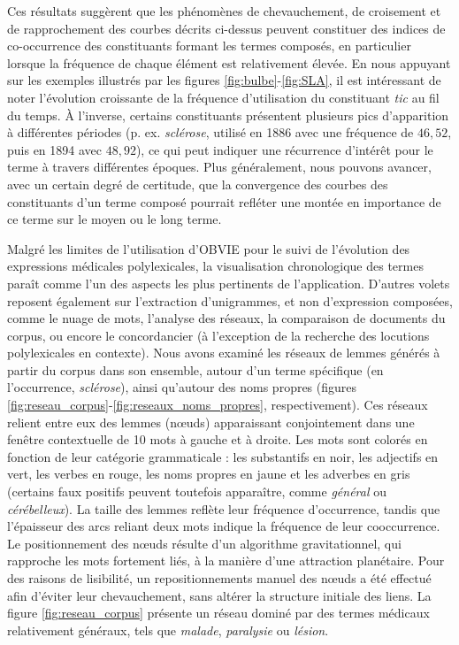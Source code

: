 Ces résultats suggèrent que les phénomènes de chevauchement, de croisement et de rapprochement des courbes décrits ci-dessus peuvent constituer des indices de co-occurrence des constituants formant les termes composés, en particulier lorsque la fréquence de chaque élément est relativement élevée. En nous appuyant sur les exemples illustrés par les figures \ref{fig:bulbe}-\ref{fig:SLA}, il est intéressant de noter l'évolution croissante de la fréquence d'utilisation du constituant \textit{tic} au fil du temps. À l'inverse, certains constituants présentent plusieurs \og{}pics\fg{} d'apparition à différentes périodes (p. ex. \textit{sclérose}, utilisé en 1886 avec une fréquence de $46,52$, puis en 1894 avec $48,92$), ce qui peut indiquer une récurrence d'intérêt pour le terme à travers différentes époques. Plus généralement, nous pouvons avancer, avec un certain degré de certitude, que la convergence des courbes des constituants d'un terme composé pourrait refléter une montée en importance de ce terme sur le moyen ou le long terme. 

Malgré les limites de l'utilisation d'\textsc{OBVIE} pour le suivi de l'évolution des expressions médicales polylexicales, la visualisation chronologique des termes paraît comme l'un des aspects les plus pertinents de l'application. D'autres volets reposent également sur l'extraction d'unigrammes, et non d'expression composées, comme le nuage de mots, l'analyse des réseaux, la comparaison de documents du corpus, ou encore le concordancier (à l'exception de la recherche des locutions polylexicales en contexte). Nous avons examiné les réseaux de lemmes générés à partir du corpus dans son ensemble, autour d'un terme spécifique (en l'occurrence, \textit{sclérose}), ainsi qu'autour des noms propres (figures \ref{fig:reseau_corpus}-\ref{fig:reseaux_noms_propres}, respectivement). Ces réseaux relient entre eux des lemmes (n\oe{}uds) apparaissant conjointement dans une fenêtre contextuelle de 10 mots à gauche et à droite. Les mots sont colorés en fonction de leur catégorie grammaticale : les substantifs en noir, les adjectifs en vert, les verbes en rouge, les noms propres en jaune et les adverbes en gris (certains faux positifs peuvent toutefois apparaître, comme \textit{général} ou \textit{cérébelleux}). La taille des lemmes reflète leur fréquence d'occurrence, tandis que l'épaisseur des arcs reliant deux mots indique la fréquence de leur cooccurrence. Le positionnement des n\oe{}uds résulte d'un algorithme gravitationnel, qui rapproche les mots fortement liés, à la manière d'une attraction planétaire. Pour des raisons de lisibilité, un repositionnements manuel des n\oe{}uds a été effectué afin d'éviter leur chevauchement, sans altérer la structure initiale des liens. La figure \ref{fig:reseau_corpus} présente un réseau dominé par des termes médicaux relativement généraux, tels que \textit{malade}, \textit{paralysie} ou \textit{lésion}. 

